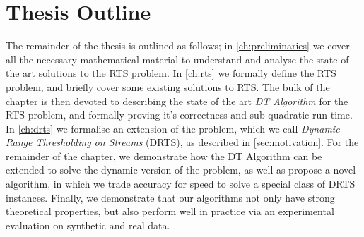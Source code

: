 \section{Thesis Outline}
\label{sec:doc-outline}

The remainder of the thesis is outlined as follows; in \cref{ch:preliminaries} we cover all the necessary mathematical material to understand and analyse the state of the art solutions to the RTS problem. In \cref{ch:rts} we formally define the RTS problem, and briefly cover some existing solutions to RTS. The bulk of the chapter is then devoted to describing the state of the art \textit{DT Algorithm} for the RTS problem, and formally proving it's correctness and sub-quadratic run time. In \cref{ch:drts} we formalise an extension of the problem, which we call \textit{Dynamic Range Thresholding on Streams} (DRTS), as described in \cref{sec:motivation}. For the remainder of the chapter, we demonstrate how the DT Algorithm can be extended to solve the dynamic version of the problem, as well as propose a novel algorithm, in which we trade accuracy for speed to solve a special class of DRTS instances. Finally, we demonstrate that our algorithms not only have strong theoretical properties, but also perform well in practice via an experimental evaluation on synthetic and real data. 
